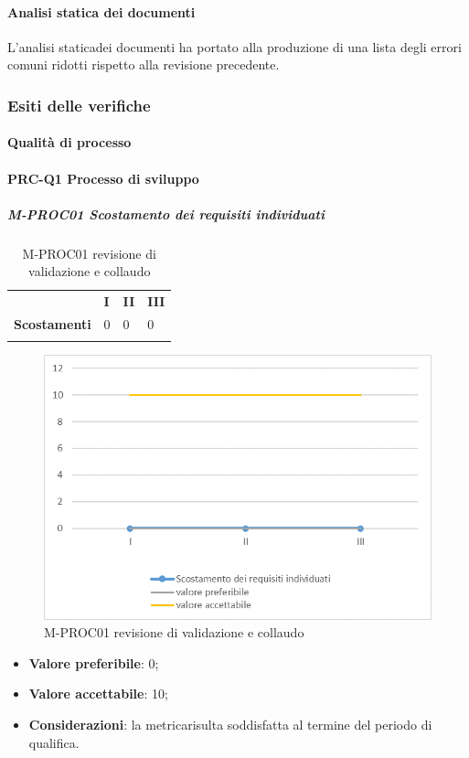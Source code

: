 \paragraph{Analisi statica dei documenti}
L'analisi statica\glosp dei documenti ha portato alla produzione di una lista degli errori comuni ridotti rispetto alla revisione precedente.
\subsubsection{Esiti delle verifiche} 
\paragraph{Qualità di processo}
\paragraph*{PRC-Q1 Processo di sviluppo}
\subparagraph{M-PROC01 Scostamento dei requisiti individuati} \mbox{}
\begin{longtable}[H!] {						
		>{}p{50mm}  		
		>{}p{8mm}
		>{}p{8mm}		
		>{}p{8mm}		
	}
	\rowcolor{gray!50}
	\textbf{} & \textbf{I} & \textbf{II} & \textbf{III}  \TBstrut \\ [2mm]
	\textbf{Scostamenti} & 0 & 0 & 0 \TBstrut \\ [2mm]
	\rowcolor{white}
	\caption{M-PROC01 revisione di validazione e collaudo}
\end{longtable}
\begin{figure}[H] 	
	\includegraphics[width=\linewidth]{./img/grafici/RA1.png}	
	\caption{M-PROC01 revisione di validazione e collaudo}	
\end{figure}
\begin{itemize}
	\item \textbf{Valore preferibile}: 0;
	\item \textbf{Valore accettabile}: 10;
	\item \textbf{Considerazioni}: la metrica\glosp risulta soddisfatta al termine del periodo di qualifica.
\end{itemize}


